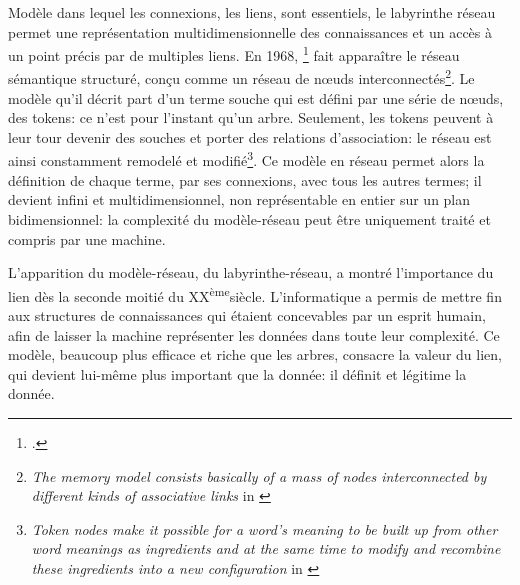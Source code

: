 Modèle dans lequel les connexions, les liens, sont essentiels, le labyrinthe réseau permet une représentation multidimensionnelle des connaissances et un accès à un point précis par de multiples liens. En 1968, \footcite[p.227-270]{minsky_semantic_1968} fait apparaître le réseau sémantique structuré, conçu comme un réseau de nœuds interconnectés\footnote{\og \textit{The memory model consists basically of a mass of nodes interconnected by different kinds of associative links}\fg{} in \cite[p.234]{minsky_semantic_1968}}. Le modèle qu'il décrit part d'un terme souche qui est défini par une série de nœuds, des tokens: ce n'est pour l'instant qu'un arbre. Seulement, les tokens peuvent à leur tour devenir des souches et porter des relations d'association: le réseau est ainsi constamment remodelé et modifié\footnote{\og \textit{Token nodes make it possible for a word's meaning to be built up from other word meanings as ingredients and at the same time to modify and recombine these ingredients into a new configuration}\fg{} in \cite[p.234]{minsky_semantic_1968}}. Ce modèle en réseau permet alors la définition de chaque terme, par ses connexions, avec tous les autres termes; il devient infini et multidimensionnel, non représentable en entier sur un plan bidimensionnel: la complexité du modèle-réseau peut être uniquement traité et compris par une machine. 

\bigskip
\bigskip
L'apparition du modèle-réseau, du labyrinthe-réseau, a montré l'importance du lien dès la seconde moitié du \textsc{XX}\textsuperscript{ème}siècle. L'informatique a permis de mettre fin aux structures de connaissances qui étaient concevables par un esprit humain, afin de laisser la machine représenter les données dans toute leur complexité. Ce modèle, beaucoup plus efficace et riche que les arbres, consacre la valeur du lien, qui devient lui-même plus important que la donnée: il définit et légitime la donnée.